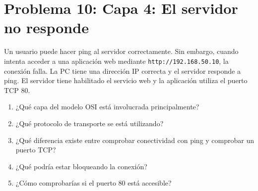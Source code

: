 \section{Problema 10: Capa 4: El servidor no responde}

\begin{tcolorbox}[enunciado]
Un usuario puede hacer ping al servidor correctamente. Sin embargo, cuando intenta acceder a una aplicación web mediante \texttt{http://192.168.50.10}, la conexión falla. La PC tiene una dirección IP correcta y el servidor responde a ping. El servidor tiene habilitado el servicio web y la aplicación utiliza el puerto TCP 80.

\begin{enumerate}[label=\arabic*., leftmargin=*]
    \item ¿Qué capa del modelo OSI está involucrada principalmente?
    \item ¿Qué protocolo de transporte se está utilizando?
    \item ¿Qué diferencia existe entre comprobar conectividad con ping y comprobar un puerto TCP?
    \item ¿Qué podría estar bloqueando la conexión?
    \item ¿Cómo comprobarías si el puerto 80 está accesible?
\end{enumerate}
\end{tcolorbox}

